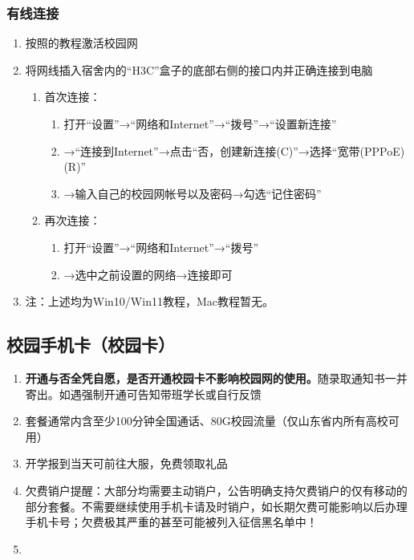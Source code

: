 \subsubsection[有线连接]{有线连接}
\begin{enumerate}
    \item 按照的教程激活校园网
    \item 将网线插入宿舍内的“H3C”盒子的底部右侧的接口内并正确连接到电脑\footnotemark
          \begin{enumerate}
              \item 首次连接：
                    \begin{enumerate}
                        \item 打开“设置”→“网络和Internet”→“拨号”→“设置新连接”
                        \item →“连接到Internet”→点击“否，创建新连接(C)”→选择“宽带(PPPoE)(R)”
                        \item →输入自己的校园网帐号以及密码→勾选“记住密码”
                    \end{enumerate}
              \item 再次连接：
                    \begin{enumerate}
                        \item 打开“设置”→“网络和Internet”→“拨号”
                        \item →选中之前设置的网络→连接即可
                    \end{enumerate}
          \end{enumerate}
    \item  注：上述均为Win10/Win11教程，Mac教程暂无。
\end{enumerate}

\subsection[校园手机卡（校园卡）]{校园手机卡（校园卡）}
\begin{enumerate}
    \item \textbf{开通与否全凭自愿，是否开通校园卡不影响校园网的使用。}随录取通知书一并寄出。如遇强制开通可告知带班学长或自行反馈
    \item 套餐\footnotemark 通常内含至少100分钟全国通话、80G校园流量（仅山东省内所有高校可用）
    \item 开学报到当天可前往大服，免费领取礼品
    \item 欠费销户提醒：大部分均需要主动销户，公告明确支持欠费销户的仅有移动的部分套餐。不需要继续使用手机卡请及时销户，如长期欠费可能影响以后办理手机卡号；欠费极其严重的甚至可能被列入征信黑名单中！
    \item \textbf{}
\end{enumerate}

